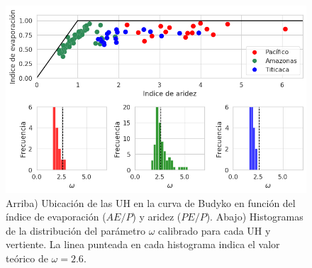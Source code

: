 \begin{figure}[htb]
	\includegraphics[scale=.78]{Images/07_Curve_and_omega.png}
	\centering
	\caption{Arriba) Ubicación de las UH en la curva de Budyko en función del índice de evaporación ($AE/P$) y aridez ($PE/P$). Abajo) Histogramas de la distribución del parámetro $\omega$ calibrado para cada UH y vertiente. La linea punteada en cada histograma indica el valor teórico de $\omega = 2.6$.}
	\label{fig:07_Curve_and_omega}
\end{figure}

